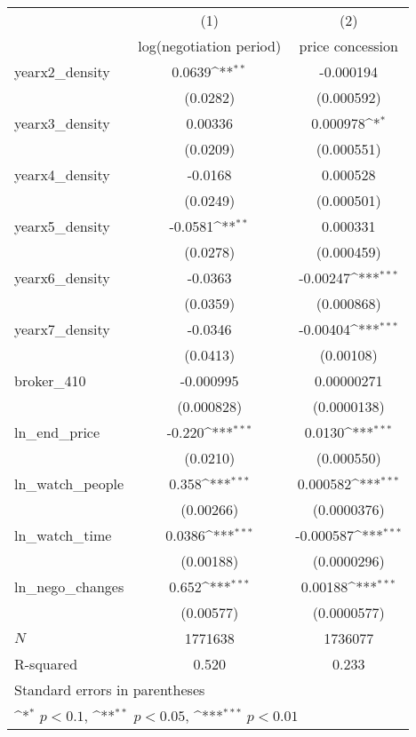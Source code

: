 {
\def\sym#1{\ifmmode^{#1}\else\(^{#1}\)\fi}
\begin{tabular}{l*{2}{c}}
\toprule
            &\multicolumn{1}{c}{(1)}&\multicolumn{1}{c}{(2)}\\
            &\multicolumn{1}{c}{log(negotiation period)}&\multicolumn{1}{c}{price concession}\\
\midrule
yearx2\_density&      0.0639\sym{**} &   -0.000194         \\
            &    (0.0282)         &  (0.000592)         \\
\addlinespace
yearx3\_density&     0.00336         &    0.000978\sym{*}  \\
            &    (0.0209)         &  (0.000551)         \\
\addlinespace
yearx4\_density&     -0.0168         &    0.000528         \\
            &    (0.0249)         &  (0.000501)         \\
\addlinespace
yearx5\_density&     -0.0581\sym{**} &    0.000331         \\
            &    (0.0278)         &  (0.000459)         \\
\addlinespace
yearx6\_density&     -0.0363         &    -0.00247\sym{***}\\
            &    (0.0359)         &  (0.000868)         \\
\addlinespace
yearx7\_density&     -0.0346         &    -0.00404\sym{***}\\
            &    (0.0413)         &   (0.00108)         \\
\addlinespace
broker\_410  &   -0.000995         &  0.00000271         \\
            &  (0.000828)         & (0.0000138)         \\
\addlinespace
ln\_end\_price&      -0.220\sym{***}&      0.0130\sym{***}\\
            &    (0.0210)         &  (0.000550)         \\
\addlinespace
ln\_watch\_people&       0.358\sym{***}&    0.000582\sym{***}\\
            &   (0.00266)         & (0.0000376)         \\
\addlinespace
ln\_watch\_time&      0.0386\sym{***}&   -0.000587\sym{***}\\
            &   (0.00188)         & (0.0000296)         \\
\addlinespace
ln\_nego\_changes&       0.652\sym{***}&     0.00188\sym{***}\\
            &   (0.00577)         & (0.0000577)         \\
\midrule
\(N\)       &     1771638         &     1736077         \\
R-squared   &       0.520         &       0.233         \\
\bottomrule
\multicolumn{3}{l}{\footnotesize Standard errors in parentheses}\\
\multicolumn{3}{l}{\footnotesize \sym{*} \(p<0.1\), \sym{**} \(p<0.05\), \sym{***} \(p<0.01\)}\\
\end{tabular}
}
